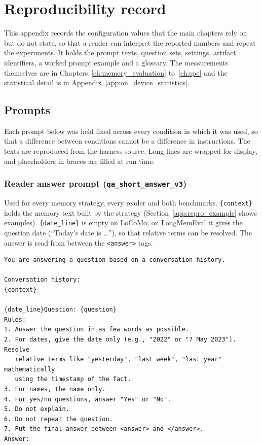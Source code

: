 
\chapter{Reproducibility record}
\label{app:reproducibility}

This appendix records the configuration values that the main chapters rely on but do not
state, so that a reader can interpret the reported numbers and repeat the experiments. It
holds the prompt texts, question sets, settings, artifact identifiers, a worked prompt example
and a glossary. The measurements themselves are in
Chapters~\ref{ch:memory_evaluation} to~\ref{ch:spe} and the statistical detail is in
Appendix~\ref{app:on_device_statistics}.

\section{Prompts}
\label{app:repro_prompts}

Each prompt below was held fixed across every condition in which it was used, so that a
difference between conditions cannot be a difference in instructions. The texts are reproduced
from the harness source. Long lines are wrapped for display, and placeholders in braces are
filled at run time.

\subsection*{Reader answer prompt (\texttt{qa\_short\_answer\_v3})}

Used for every memory strategy, every reader and both benchmarks. \texttt{\{context\}} holds the
memory text built by the strategy (Section~\ref{app:repro_example} shows examples).
\texttt{\{date\_line\}} is empty on LoCoMo; on LongMemEval it gives the question date
(``Today's date is \ldots''), so that relative terms can be resolved. The answer is read from
between the \texttt{<answer>} tags.

\begin{small}
\begin{verbatim}
You are answering a question based on a conversation history.

Conversation history:
{context}

{date_line}Question: {question}
Rules:
1. Answer the question in as few words as possible.
2. For dates, give the date only (e.g., "2022" or "7 May 2023"). Resolve
   relative terms like "yesterday", "last week", "last year" mathematically
   using the timestamp of the fact.
3. For names, the name only.
4. For yes/no questions, answer "Yes" or "No".
5. Do not explain.
6. Do not repeat the question.
7. Put the final answer between <answer> and </answer>.
Answer:
\end{verbatim}
\end{small}

